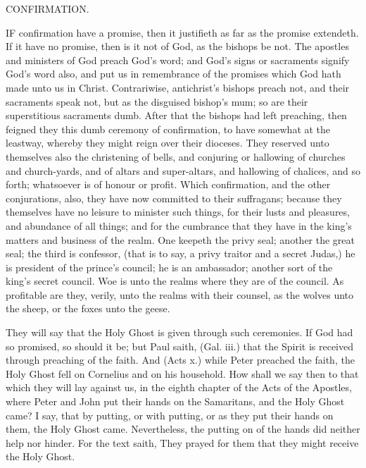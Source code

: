 CONFIRMATION. 

IF confirmation have a promise, then it justifieth as far 
as the promise extendeth. If it have no promise, then 
is it not of God, as the bishops be not. The apostles and 
ministers of God preach God's word; and God's signs or 
sacraments signify God's word also, and put us in remembrance
of the promises which God hath made unto us in 
Christ. Contrariwise, antichrist's bishops preach not, 
and their sacraments speak not, but as the disguised 
bishop's mum; so are their superstitious sacraments 
dumb. After that the bishops had left preaching, then 
feigned they this dumb ceremony of confirmation, to have 
somewhat at the leastway, whereby they might reign over 
their dioceses. They reserved unto themselves also the 
christening of bells, and conjuring or hallowing of 
churches and church-yards, and of altars and super-altars, 
and hallowing of chalices, and so forth; whatsoever is of 
honour or profit. Which confirmation, and the other conjurations,
also, they have now committed to their suffragans;
because they themselves have no leisure to 
minister such things, for their lusts and pleasures, and 
abundance of all things; and for the cumbrance that they 
have in the king's matters and business of the realm. One 
keepeth the privy seal; another the great seal; the third is 
confessor, (that is to say, a privy traitor and a secret Judas,) 
he is president of the prince's council; he is an ambassador;
another sort of the king's secret council. Woe 
is unto the realms where they are of the council. As profitable
are they, verily, unto the realms with their counsel, 
as the wolves unto the sheep, or the foxes unto the geese. 

They will say that the Holy Ghost is given through 
such ceremonies. If God had so promised, so should it 
be; but Paul saith, (Gal. iii.) that the Spirit is received 
through preaching of the faith. And (Acts x.) while 
Peter preached the faith, the Holy Ghost fell on Cornelius
and on his household. How shall we say then to that 
which they will lay against us, in the eighth chapter of 
the Acts of the Apostles, where Peter and John put their 
hands on the Samaritans, and the Holy Ghost came? I 
say, that by putting, or with putting, or as they put their 
hands on them, the Holy Ghost came. Nevertheless, the 
putting on of the hands did neither help nor hinder. For 
the text saith, They prayed for them that they might receive 
the Holy Ghost. 


